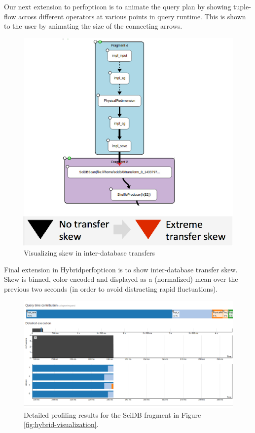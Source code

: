 \documentclass{chi2009}
\begin{document}
Our next extension to perfopticon is to animate the query plan by showing tuple-flow across different operators at various points in query runtime. This is shown to the user by animating the size of the connecting arrows. 

\begin{figure}[h]
\begin{center}
\includegraphics[scale=0.5]{skew.png}
\end{center}
\caption{Visualizing skew in inter-database transfers}
\label{fig:skew}
\end{figure}
Final extension in Hybridperfopticon is to show inter-database transfer skew. Skew is binned, color-encoded and displayed as a (normalized) mean over the previous two seconds (in order to avoid distracting rapid fluctuations). 

\begin{figure}[t]
\centering
\includegraphics[width=\textwidth]{visualization-detail.png}
\caption{Detailed profiling results for the SciDB fragment in Figure \ref{fig:hybrid-visualization}.}
\label{fig:scidb-detail}
\end{figure}
\end{document}
